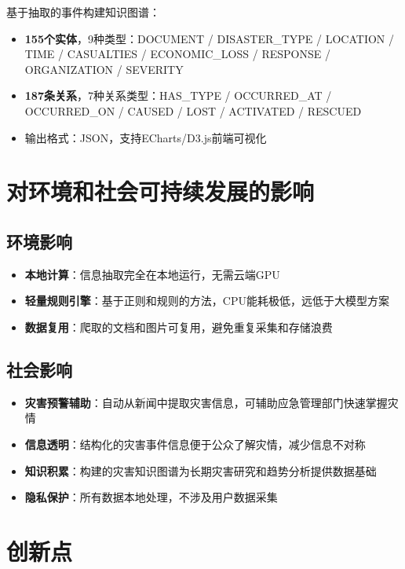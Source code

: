 \documentclass[12pt,a4paper]{ctexart}
\begin{document}
基于抽取的事件构建知识图谱：
\begin{itemize}
    \item \textbf{155个实体}，9种类型：DOCUMENT / DISASTER\_TYPE / LOCATION / TIME / CASUALTIES / ECONOMIC\_LOSS / RESPONSE / ORGANIZATION / SEVERITY
    \item \textbf{187条关系}，7种关系类型：HAS\_TYPE / OCCURRED\_AT / OCCURRED\_ON / CAUSED / LOST / ACTIVATED / RESCUED
    \item 输出格式：JSON，支持ECharts/D3.js前端可视化
\end{itemize}

\section{对环境和社会可持续发展的影响}

\subsection{环境影响}

\begin{itemize}
    \item \textbf{本地计算}：信息抽取完全在本地运行，无需云端GPU
    \item \textbf{轻量规则引擎}：基于正则和规则的方法，CPU能耗极低，远低于大模型方案
    \item \textbf{数据复用}：爬取的文档和图片可复用，避免重复采集和存储浪费
\end{itemize}

\subsection{社会影响}

\begin{itemize}
    \item \textbf{灾害预警辅助}：自动从新闻中提取灾害信息，可辅助应急管理部门快速掌握灾情
    \item \textbf{信息透明}：结构化的灾害事件信息便于公众了解灾情，减少信息不对称
    \item \textbf{知识积累}：构建的灾害知识图谱为长期灾害研究和趋势分析提供数据基础
    \item \textbf{隐私保护}：所有数据本地处理，不涉及用户数据采集
\end{itemize}

\section{创新点}
\end{document}
